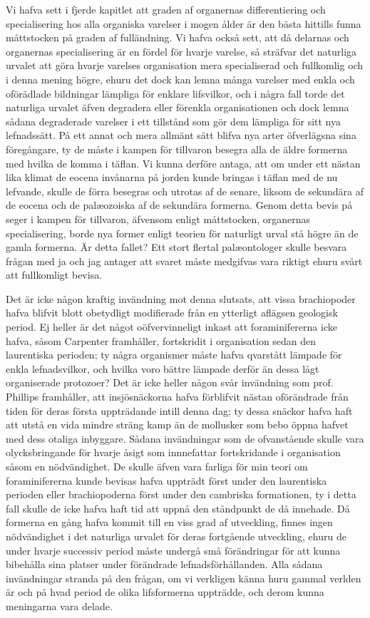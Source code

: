 Vi hafva sett i fjerde kapitlet att graden af organernas differentiering och specialisering hos alla organiska varelser i mogen ålder är den bästa hittills funna måttstocken på graden af fulländning. Vi hafva också sett, att då delarnas och organernas specialisering är en fördel för hvarje varelse, så sträfvar det naturliga urvalet att göra hvarje varelses organisation mera specialiserad och fullkomlig och i denna mening högre, ehuru det dock kan lemna många varelser med enkla och oförädlade bildningar lämpliga för enklare lifsvilkor, och i några fall torde det naturliga urvalet äfven degradera eller förenkla organisationen och dock lemna sådana degraderade varelser i ett tillstånd som gör dem lämpliga för sitt nya lefnadssätt. På ett annat och mera allmänt sätt blifva nya arter öfverlägsna sina föregångare, ty de måste i kampen för tillvaron besegra alla de äldre formerna med hvilka de komma i täflan. Vi kunna derföre antaga, att om under ett nästan lika klimat de eocena invånarna på jorden kunde bringas i täflan med de nu lefvande, skulle de förra besegras och utrotas af de senare, liksom de sekundära af de eocena och de palæozoiska af de sekundära formerna. Genom detta bevis på seger i kampen för tillvaron, äfvensom enligt måttstocken, organernas specialisering, borde nya former enligt teorien för naturligt urval stå högre än de gamla formerna. Är detta fallet? Ett stort flertal palæontologer skulle besvara frågan med ja och jag antager att svaret måste medgifvas vara riktigt ehuru svårt att fullkomligt bevisa.

Det är icke någon kraftig invändning mot denna slutsats, att vissa brachiopoder hafva blifvit blott obetydligt modifierade från en ytterligt aflägsen geologisk period. Ej heller är det något oöfvervinneligt inkast att foraminifererna icke hafva, såsom Carpenter framhåller, fortskridit i organisation sedan den laurentiska perioden; ty några organismer måste hafva qvarstått lämpade för enkla lefnadsvilkor, och hvilka voro bättre lämpade derför än dessa lågt organiserade protozoer? Det är icke heller någon svår invändning som prof. Phillips framhåller, att insjösnäckorna hafva förblifvit nästan oförändrade från tiden för deras första uppträdande intill denna dag; ty dessa snäckor hafva haft att utstå en vida mindre sträng kamp än de mollusker som bebo öppna hafvet med dess otaliga inbyggare. Sådana invändningar som de ofvanstående skulle vara olycksbringande för hvarje åsigt som innnefattar fortskridande i organisation såsom en nödvändighet. De skulle äfven vara farliga för min teori om foraminifererna kunde bevisas hafva uppträdt först under den laurentiska perioden eller brachiopoderna först under den cambriska formationen, ty i detta fall skulle de icke hafva haft tid att uppnå den ståndpunkt de då innehade. Då formerna en gång hafva kommit till en viss grad af utveckling, finnes ingen nödvändighet i det naturliga urvalet för deras fortgående utveckling, ehuru de under hvarje successiv period måste undergå små förändringar för att kunna bibehålla sina platser under förändrade lefnadsförhållanden. Alla sådana invändningar stranda på den frågan, om vi verkligen känna huru gammal verlden är och på hvad period de olika lifsformerna uppträdde, och derom kunna meningarna vara delade.

